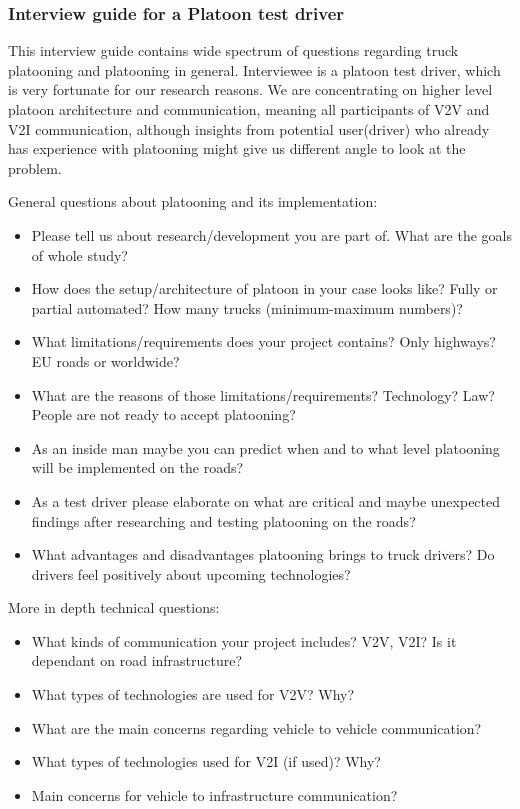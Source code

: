 \subsubsection{Interview guide for a Platoon test driver}

This interview guide contains wide spectrum of questions regarding truck platooning and platooning in general. Interviewee is a platoon test driver, which is very fortunate for our research reasons. We are concentrating on higher level platoon architecture and communication, meaning all participants of V2V and V2I communication, although insights from potential user(driver) who already has experience with platooning might give us different angle to look at the problem.\par
% 
General questions about platooning and its implementation:
\begin{itemize}[noitemsep]
    \item Please tell us about research/development you are part of. What are the goals of whole study?
    \item How does the setup/architecture of platoon in your case looks like? Fully or partial automated? How many trucks (minimum-maximum numbers)?
    \item What limitations/requirements does your project contains? Only highways? EU roads or worldwide? 
    \item What are the reasons of those limitations/requirements? Technology? Law? People are not ready to accept platooning?
    \item As an inside man maybe you can predict when and to what level platooning will be implemented on the roads? \\
    \item As a test driver please elaborate on what are critical and maybe unexpected findings after researching and testing platooning on the roads?
    \item What advantages and disadvantages platooning brings to truck drivers? Do drivers feel positively about upcoming technologies?
\end{itemize}
%
\par
%
More in depth technical questions:
\begin{itemize}[noitemsep]
    \item What kinds of communication your project includes? V2V, V2I? Is it dependant on road infrastructure?
    \item What types of technologies are used for V2V? Why?
    \item What are the main concerns regarding vehicle to vehicle communication?
    \item What types of technologies used for V2I (if used)? Why?
    \item Main concerns for vehicle to infrastructure communication?
\end{itemize}